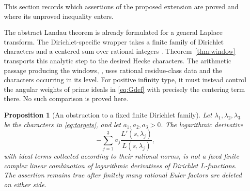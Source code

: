 \documentclass[11pt]{article}
\newtheorem{proposition}[theorem]{Proposition}
\theoremstyle{definition}
\theoremstyle{remark}
\begin{document}
This section records which assertions of the proposed extension are
proved and where its unproved inequality enters.

The abstract Landau theorem is already formulated for a general
Laplace transform.  The Dirichlet-specific wrapper takes a finite family
of Dirichlet characters and a centered sum over rational integers
\cite[\texttt{CharFamily}, \texttt{Gchi},
\texttt{zeroFree\_of\_rpow\_window}]{AlpogeCode,AlpogeWindow}.
Theorem~\ref{thm:window} transports this analytic step to the desired
Hecke characters.  The arithmetic passage producing the windows,
\cite[\texttt{windowInequality\_of\_artinInputs} and
\texttt{level\_gm\_le\_on\_family\_scales}]{AlpogeArithmetic}, uses
rational residue-class data and the characters occurring in its level.
For positive infinity type, it must instead control the angular weights
of prime ideals in \eqref{eq:Gdef} with precisely the centering term there.
No such comparison is proved here.

\begin{proposition}[An obstruction to a fixed finite Dirichlet family]
\label{prop:finite-family}
Let $\lambda_1,\lambda_2,\lambda_3$ be the characters in
\eqref{eq:targets}, and let $a_1,a_2,a_3>0$.  The logarithmic derivative
\[
 -\sum_{j=1}^3a_j\frac{L'(s,\lambda_j)}{L(s,\lambda_j)},
\]
with ideal terms collected according to their rational norms, is not a
fixed finite complex linear combination of logarithmic derivatives of
Dirichlet $L$-functions.  The assertion remains true after finitely many
rational Euler factors are deleted on either side.
\end{proposition}
\end{document}
